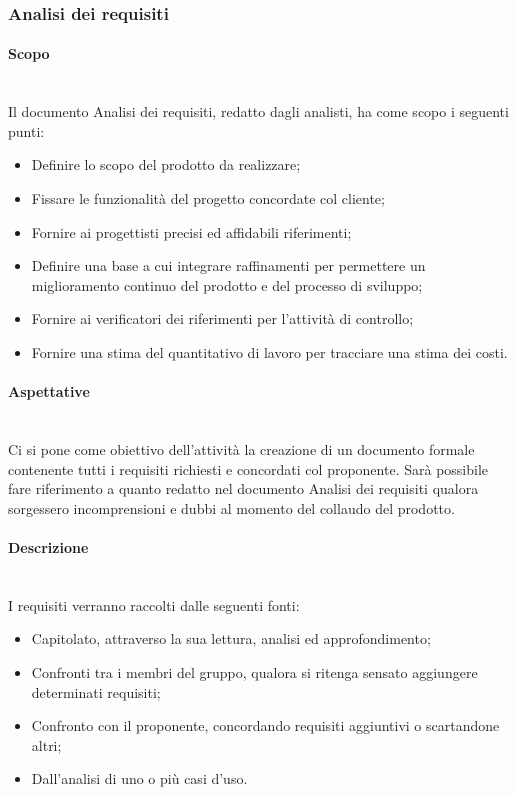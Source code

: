 \subsubsection{Analisi dei requisiti}
\paragraph{Scopo}\mbox{}\\

Il documento Analisi dei requisiti, redatto dagli analisti, ha come scopo i seguenti punti:

\begin{itemize}
\item Definire lo scopo del prodotto da realizzare;
\item Fissare le funzionalità del progetto concordate col cliente;
\item Fornire ai progettisti precisi ed affidabili riferimenti;
\item Definire una base a cui integrare raffinamenti per permettere un miglioramento continuo del prodotto e del processo di sviluppo;
\item Fornire ai verificatori dei riferimenti per l’attività di controllo;
\item Fornire una stima del quantitativo di lavoro per tracciare una stima dei costi. 
\end{itemize}

\paragraph{Aspettative}\mbox{}\\
Ci si pone come obiettivo dell’attività la creazione di un documento formale contenente tutti i requisiti richiesti e concordati col proponente. Sarà possibile fare riferimento a quanto redatto nel documento Analisi dei requisiti qualora sorgessero incomprensioni e dubbi al momento del collaudo del prodotto.

\paragraph{Descrizione}\mbox{}\\
I requisiti verranno raccolti dalle seguenti fonti:
\begin{itemize}
\item Capitolato, attraverso la sua lettura, analisi ed approfondimento;
\item Confronti tra i membri del gruppo, qualora si ritenga sensato aggiungere determinati requisiti;
\item Confronto con il proponente, concordando requisiti aggiuntivi o scartandone altri;
\item Dall’analisi di uno o più casi d’uso.
\end{itemize}

